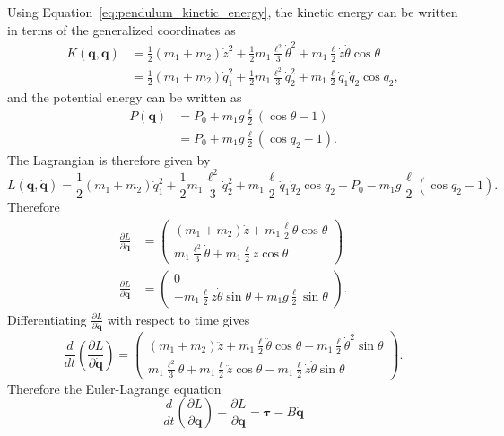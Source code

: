 Using Equation~\eqref{eq:pendulum_kinetic_energy}, the kinetic energy can be written in terms of the generalized coordinates as
\begin{align*}
K(\mathbf{q},\dot{\mathbf{q}}) &= \frac{1}{2}(m_1+m_2)\dot{z}^2 + \frac{1}{2}m_1\frac{\ell^2}{3}\dot{\theta}^2 + m_1\frac{\ell}{2}\dot{z}\dot{\theta}\cos\theta \\
&= \frac{1}{2}(m_1+m_2)\dot{q}_1^2 + \frac{1}{2}m_1\frac{\ell^2}{3}\dot{q}_2^2 + m_1\frac{\ell}{2}\dot{q}_1\dot{q}_2\cos q_2,
\end{align*}
and the potential energy can be written as
\begin{align*}
P(\mathbf{q}) &= P_0 + m_1 g \frac{\ell}{2}(\cos\theta-1)\\
&= P_0 + m_1 g \frac{\ell}{2}(\cos q_2-1).
\end{align*}
The Lagrangian is therefore given by
\[
L(\mathbf{q},\dot{\mathbf{q}}) = \frac{1}{2}(m_1+m_2)\dot{q}_1^2 + \frac{1}{2}m_1\frac{\ell^2}{3}\dot{q}_2^2 + m_1\frac{\ell}{2}\dot{q}_1\dot{q}_2\cos q_2- P_0 - m_1 g \frac{\ell}{2}(\cos q_2-1).	
\]
Therefore
\begin{align*}
\frac{\partial L}{\partial\dot{\mathbf{q}}} &= \begin{pmatrix} 
(m_1+m_2)\dot{z} + m_1\frac{\ell}{2}\dot{\theta}\cos\theta \\
m_1\frac{\ell^2}{3}\dot{\theta} + m_1\frac{\ell}{2}\dot{z}\cos\theta
\end{pmatrix} \\
\frac{\partial L}{\partial\mathbf{q}} &= \begin{pmatrix}
0 \\ -m_1\frac{\ell}{2}\dot{z}\dot{\theta}\sin\theta + m_1 g \frac{\ell}{2} \sin\theta
\end{pmatrix}.
\end{align*}
Differentiating $\frac{\partial L}{\partial \dot{\mathbf{q}}}$ with respect to time gives
\[
\frac{d}{dt}\left(\frac{\partial L}{\partial \dot{\mathbf{q}}}\right) = \begin{pmatrix} 
(m_1+m_2)\ddot{z} + m_1 \frac{\ell}{2} \ddot{\theta}\cos\theta - m_1 \frac{\ell}{2} \dot{\theta}^2\sin\theta \\
m_1 \frac{\ell^2}{3} \ddot{\theta} + m_1 \frac{\ell}{2} \ddot{z}\cos\theta - m_1 \frac{\ell}{2} \dot{z}\dot{\theta}\sin\theta
\end{pmatrix}.
\]
Therefore the Euler-Lagrange equation
\[
\frac{d}{dt}\left(\frac{\partial L}{\partial\dot{\mathbf{q}}} \right) - \frac{\partial L}{\partial \mathbf{q}} =  \boldsymbol{\tau}-B\dot{\mathbf{q}}
\]
